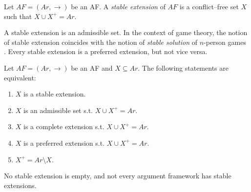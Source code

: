 \begin{df}
    Let $AF=(Ar,\to)$ be an AF. 
    A  \textit{stable extension} of $AF$ is a conflict--free set $X$ such that $X \cup X^+ = Ar$. 
\end{df}


A stable extension is an admissible set.
% 
In the context of game theory, 
the notion of stable extension coincides with the notion of \textit{stable solution} of $n$-person games \cite{Dun1995}. 
% 
Every stable extension is a preferred extension, 
but not vice versa. 


\begin{prop}
    Let $AF=(Ar,\to)$ be an AF and $X \subseteq Ar$. 
    The following statements are equivalent:
    \begin{enumerate}[itemsep=5pt,parsep=5pt,leftmargin=3em,topsep=5pt,label=(\arabic*)] 
        \item $X$ is a stable extension. 
        
        \item $X$ is an admissible set s.t. $X \cup X^+ = Ar$.
        
        \item $X$ is a complete extension s.t. $X \cup X^+ = Ar$.
        
        \item $X$ is a preferred extension s.t. $X \cup X^+ = Ar$.
        
        \item $X^+ = Ar \setminus X$.
    \end{enumerate}
\end{prop}


No stable extension is empty, 
and not every argument framework has stable extensions.



